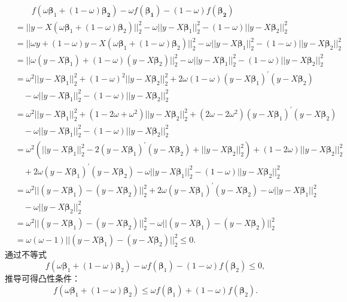 \documentclass{NauThesis}
\begin{document}
$$
\begin{aligned}
    &\qquad f(\omega\boldsymbol{\beta}_1+(1-\omega)\boldsymbol{\beta_2})- \omega f(\boldsymbol{\beta_1})-(1-\omega)f(\boldsymbol{\beta_2}) \\
    &=||y-X(\omega\boldsymbol{\beta}_1+(1-\omega)\boldsymbol{\beta}_2)||_2^2-\omega||y-X\boldsymbol{\beta}_1||_2^2-(1-\omega)||y-X\boldsymbol{\beta}_2||_2^2 \\
    &=||\omega y+(1-\omega)y-X(\omega\boldsymbol{\beta}_1+(1-\omega)\boldsymbol{\beta}_2)||_2^2-\omega||y-X\boldsymbol{\beta}_1||_2^2-(1-\omega)||y-X\boldsymbol{\beta}_2||_2^2 \\
    &=||\omega(y-X\boldsymbol{\beta}_1)+(1-\omega)(y-X\boldsymbol{\beta}_2)||_2^2-\omega||y-X\boldsymbol{\beta}_1||_2^2-(1-\omega)||y-X\boldsymbol{\beta}_2||_2^2 \\
    &=\omega^2||y-X\boldsymbol{\beta}_1||_2^2+(1-\omega)^2||y-X\boldsymbol{\beta}_2||_2^2 +2\omega(1-\omega)(y-X\boldsymbol{\beta}_1)^\prime(y-X\boldsymbol{\beta}_2)\\
    &\quad{}-\omega||y-X\boldsymbol{\beta}_1||_2^2-(1-\omega)||y-X\boldsymbol{\beta}_2||_2^2 \\
    &=\omega^2||y-X\boldsymbol{\beta}_1||_2^2+(1-2\omega+\omega^2)||y-X\boldsymbol{\beta}_2||_2^2 +(2\omega-2\omega^2)(y-X\boldsymbol{\beta}_1)^\prime(y-X\boldsymbol{\beta}_2)\\
    &\quad{}-\omega||y-X\boldsymbol{\beta}_1||_2^2-(1-\omega)||y-X\boldsymbol{\beta}_2||_2^2 \\
    &=\omega^2\left(||y-X\boldsymbol{\beta}_1||_2^2 - 2(y-X\boldsymbol{\beta}_1)^\prime(y-X\boldsymbol{\beta}_2)+||y-X\boldsymbol{\beta}_2||_2^2 \right)+(1-2\omega)||y-X\boldsymbol{\beta}_2||_2^2\\
    &\quad{}+2\omega(y-X\boldsymbol{\beta}_1)^\prime(y-X\boldsymbol{\beta}_2)-\omega||y-X\boldsymbol{\beta}_1||_2^2-(1-\omega)||y-X\boldsymbol{\beta}_2||_2^2 \\
    &=\omega^2||(y-X\boldsymbol{\beta}_1)-(y-X\boldsymbol{\beta}_2)||_2^2+2\omega(y-X\boldsymbol{\beta}_1)^\prime(y-X\boldsymbol{\beta}_2)-\omega||y-X\boldsymbol{\beta}_1||_2^2\\
    &\quad{}-\omega||y-X\boldsymbol{\beta}_2||_2^2 \\
    &=\omega^2||(y-X\boldsymbol{\beta}_1)-(y-X\boldsymbol{\beta}_2)||_2^2-\omega||(y-X\boldsymbol{\beta}_1)-(y-X\boldsymbol{\beta}_2)||_2^2 \\
    &=\omega(\omega-1)||(y-X\boldsymbol{\beta}_1)-(y-X\boldsymbol{\beta}_2)||_2^2 \le0.
\end{aligned}
$$
通过不等式$$f(\omega\boldsymbol{\beta}_1+(1-\omega)\boldsymbol{\beta}_2)- \omega f(\boldsymbol{\beta}_1)-(1-\omega)f(\boldsymbol{\beta}_2)\le0,$$
推导可得凸性条件：$$
    f(\omega\boldsymbol{\beta}_1+(1-\omega)\boldsymbol{\beta}_2)\le \omega f(\boldsymbol{\beta}_1)+(1-\omega)f(\boldsymbol{\beta}_2).$$
\end{document}
